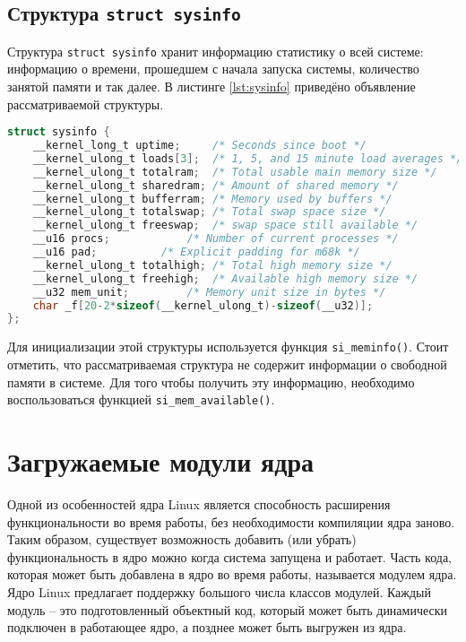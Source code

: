 \subsection{Структура \texttt{struct sysinfo}}

Структура \texttt{struct sysinfo} \cite{sysinfo} хранит информацию статистику о всей системе: информацию о времени, прошедшем с начала запуска системы, количество занятой памяти и так далее. В листинге \ref{lst:sysinfo} приведёно объявление рассматриваемой структуры.\\

\begin{lstlisting}[label=lst:sysinfo, caption=Листинг структуры \texttt{struct sysinfo}, language=c]
struct sysinfo {
	__kernel_long_t uptime;		/* Seconds since boot */
	__kernel_ulong_t loads[3];	/* 1, 5, and 15 minute load averages */
	__kernel_ulong_t totalram;	/* Total usable main memory size */
	__kernel_ulong_t sharedram;	/* Amount of shared memory */
	__kernel_ulong_t bufferram;	/* Memory used by buffers */
	__kernel_ulong_t totalswap;	/* Total swap space size */
	__kernel_ulong_t freeswap;	/* swap space still available */
	__u16 procs;		   	/* Number of current processes */
	__u16 pad;		   	/* Explicit padding for m68k */
	__kernel_ulong_t totalhigh;	/* Total high memory size */
	__kernel_ulong_t freehigh;	/* Available high memory size */
	__u32 mem_unit;			/* Memory unit size in bytes */
	char _f[20-2*sizeof(__kernel_ulong_t)-sizeof(__u32)];
};
\end{lstlisting}

Для инициализации этой структуры используется функция \texttt{si\_meminfo()}. Стоит отметить, что рассматриваемая структура не содержит информации о свободной памяти в системе. Для того чтобы получить эту информацию, необходимо воспользоваться функцией \texttt{si\_mem\_available()}.

\section{Загружаемые модули ядра}

Одной из особенностей ядра Linux является способность расширения функциональности во время работы, без необходимости компиляции ядра заново. Таким образом, существует возможность добавить (или убрать) функциональность в ядро можно когда система запущена и работает. Часть кода, которая может быть добавлена в ядро во время работы, называется модулем ядра. Ядро Linux предлагает поддержку большого числа классов модулей. Каждый модуль -- это подготовленный объектный код, который может быть динамически подключен в работающее ядро, а позднее может быть выгружен из ядра.

